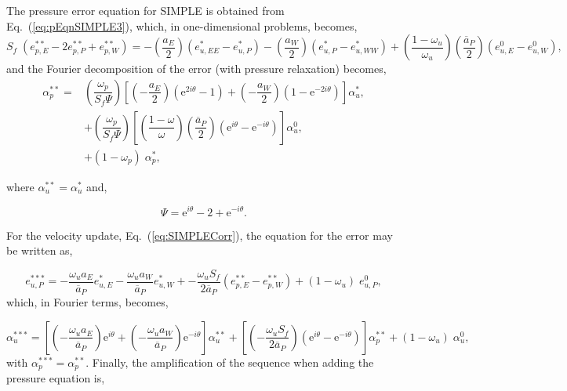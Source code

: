 \documentclass[final,3p,times,11pt,onecolumn]{myElsarticle}
\numberwithin{equation}{section}
\begin{document}
The pressure error equation for SIMPLE is obtained from Eq.~(\ref{eq:pEqnSIMPLE3}), which, in one-dimensional problems, becomes,
\begin{equation}
    S_f \; (e_{p,E}^{**} - 2 e_{p,P}^{**} + e_{p,W}^{**}) = 
     -\left(\dfrac{a_E}{2}\right) (e_{u,EE}^* - e_{u,P}^*) 
    -\left(\dfrac{a_W}{2}\right) (e_{u,P}^* - e_{u,WW}^*)  +
    \left( \dfrac{1-\omega_u}{\omega_u} \right) \left(\dfrac{\overline{a}_P}{2}\right) (e_{u,E}^0 - e_{u,W}^0),
\end{equation}
and the Fourier decomposition of the error (with pressure relaxation) becomes,
\begin{equation}
\begin{split}
    \alpha_p^{**} = &\left( \dfrac{\omega_p}{S_f \Psi} \right) 
                    \left[ \left(-\dfrac{a_E}{2} \right) \left(\text{e}^{2 i \theta} - 1 \right) +
                            \left(-\dfrac{a_W}{2} \right) \left(1 - \text{e}^{-2 i \theta}\right)
                    \right] \alpha_u^{*}, \\
                    & + \left( \dfrac{\omega_p}{S_f \Psi} \right) 
                    \left[ \left(\dfrac{1-\omega}{\omega} \right) \left(\dfrac{\overline{a}_P}{2} \right) \left(\text{e}^{i \theta} - \text{e}^{- i \theta} \right) 
                    \right] \alpha_u^{0}, \\
                    & + (1-\omega_p) \; \alpha_p^*,   
\end{split}
\end{equation}

\noindent where $\alpha_u^{**} = \alpha_u^{*}$ and,

\begin{equation}
    \Psi = \text{e}^{i \theta} - 2 + \text{e}^{- i \theta}.
\end{equation}

For the velocity update, Eq.~(\ref{eq:SIMPLECorr}), the equation for the error may be written as,

\begin{equation}
    e_{u,P}^{***} = -\dfrac{\omega_u a_E}{\overline{a}_P} e_{u,E}^{*} -\dfrac{\omega_u a_W}{\overline{a}_P} e_{u,W}^{*} +
                   -\dfrac{\omega_u S_f}{2 \overline{a}_P} (e_{p,E}^{**}-e_{p,W}^{**}) +
                   (1-\omega_u) \; e_{u,P}^0,
\end{equation}
which, in Fourier terms, becomes,

\begin{equation}
    \alpha_{u}^{***} = \left[\left(-\dfrac{\omega_u a_E}{\overline{a}_P}\right) \text{e}^{i \theta} + \left(- \dfrac{\omega_u a_W}{\overline{a}_P}\right) \text{e}^{- i \theta}\right] \alpha_u^{**} +
                   \left[\left(-\dfrac{\omega_u S_f}{2 \overline{a}_P}\right) \left(\text{e}^{i \theta}-\text{e}^{-i \theta}\right) \right] \alpha_p^{**} +
                   (1-\omega_u) \; \alpha_u^0,
\end{equation}
with $\alpha_p^{***}=\alpha_p^{**}$.
Finally, the amplification of the sequence when adding the pressure equation is,
\end{document}
